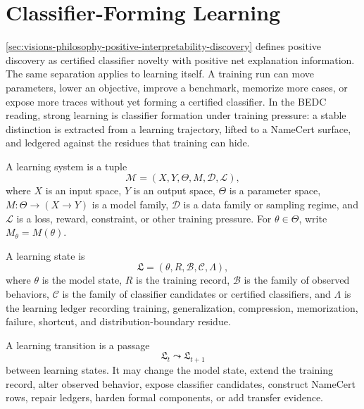 \section{Classifier-Forming Learning}
\label{sec:visions-philosophy-classifier-forming-learning}

\autoref{sec:visions-philosophy-positive-interpretability-discovery}
defines positive discovery as certified classifier novelty with positive
net explanation information. The same separation applies to learning
itself. A training run can move parameters, lower an objective, improve a
benchmark, memorize more cases, or expose more traces without yet
forming a certified classifier. In the BEDC reading, strong learning is
classifier formation under training pressure: a stable distinction is
extracted from a learning trajectory, lifted to a NameCert surface, and
ledgered against the residues that training can hide.

\begin{definition}
\label{def:philosophy-learning-system}
A learning system is a tuple
$$
\mathcal M=(X,Y,\Theta,M,\mathcal D,\mathcal L),
$$
where $X$ is an input space, $Y$ is an output space, $\Theta$ is a
parameter space, $M:\Theta\to(X\to Y)$ is a model family,
$\mathcal D$ is a data family or sampling regime, and $\mathcal L$ is a
loss, reward, constraint, or other training pressure. For
$\theta\in\Theta$, write $M_{\theta}=M(\theta)$.
\end{definition}

\begin{definition}
\label{def:philosophy-learning-state}
A learning state is
$$
\mathfrak L=(\theta,R,\mathcal B,\mathcal C,\Lambda),
$$
where $\theta$ is the model state, $R$ is the training record,
$\mathcal B$ is the family of observed behaviors, $\mathcal C$ is the
family of classifier candidates or certified classifiers, and
$\Lambda$ is the learning ledger recording training, generalization,
compression, memorization, failure, shortcut, and distribution-boundary
residue.
\end{definition}

\begin{definition}
\label{def:philosophy-learning-transition}
A learning transition is a passage
$$
\mathfrak L_t\leadsto\mathfrak L_{t+1}
$$
between learning states. It may change the model state, extend the
training record, alter observed behavior, expose classifier candidates,
construct NameCert rows, repair ledgers, harden formal components, or
add transfer evidence.
\end{definition}

